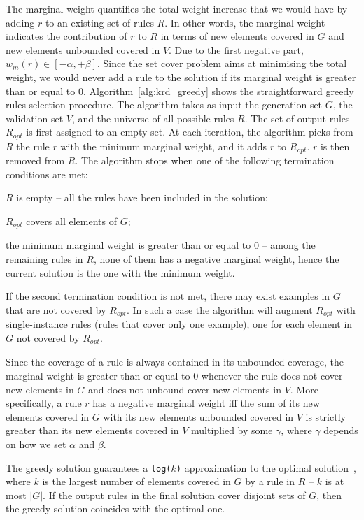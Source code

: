 The marginal weight quantifies the total weight increase that we would have by adding $r$ to an existing set of rules $R$. In other words, the marginal weight indicates the contribution of $r$ to $R$ in terms of new elements covered in $G$ and new elements unbounded covered in $V$. Due to the first negative part, $w_m(r) \in [-\alpha,+\beta]$. Since the set cover problem aims at minimising the total weight, we would never add a rule to the solution if its marginal weight is greater than or equal to $0$.
Algorithm~\ref{alg:krd_greedy} shows the straightforward greedy rules selection procedure. The algorithm takes as input the generation set $G$, the validation set $V$, and the universe of all possible rules $R$. The set of output rules $R_{opt}$ is first assigned to an empty set. At each iteration, the algorithm picks from $R$ the rule $r$ with the minimum marginal weight, and it adds $r$ to $R_{opt}$. $r$ is then removed from $R$. The algorithm stops when one of the following termination conditions are met:
\begin{inparaenum} [\itshape1)]
	\item $R$ is empty -- all the rules have been included in the solution;
	\item $R_{opt}$ covers all elements of $G$;
	\item the minimum marginal weight is greater than or equal to $0$ -- among the remaining rules in $R$, none of them has a negative marginal weight, hence the current solution is the one with the minimum weight.
\end{inparaenum}
If the second termination condition is not met, there may exist examples in $G$ that are not covered by $R_{opt}$. In such a case the algorithm will augment $R_{opt}$ with single-instance rules (rules that cover only one example), one for each element in $G$ not covered by $R_{opt}$.

Since the coverage of a rule is always contained in its unbounded coverage, the marginal weight is greater than or equal to $0$ whenever the rule does not cover new elements in $G$ and does not unbound cover new elements in $V$. More specifically, a rule $r$ has a negative marginal weight iff the sum of its new elements covered in $G$ with its new elements unbounded covered in $V$ is strictly greater than its new elements covered in $V$ multiplied by some $\gamma$, where $\gamma$ depends on how we set $\alpha$ and $\beta$.

The greedy solution guarantees a \texttt{log($k$)} approximation
to the optimal solution~\cite{chvatal1979greedy}, where $k$ is the largest number of elements covered in $G$ by a rule in $R$ -- $k$ is at most $|G|$. If the output rules in the final solution cover disjoint sets of $G$, then the greedy solution coincides with the optimal one.

